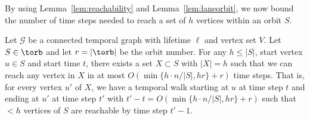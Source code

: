 By using Lemma~\ref{lem:reachability} and Lemma~\ref{lem:laneorbit}, we now
bound the number of time steps needed to reach a set of $h$ vertices within an
orbit $S$.

\begin{lemma}\label{lem:nextreachable} Let $\mathcal{G}$ be a connected temporal
graph with lifetime $\ell$ and vertex set $V$. Let $S \in \torb$ and let
$r=|\torb|$ be the orbit number. For any $h \leq |S|$, start vertex {$u \in S$}
{and start time $t$}, there exists a set $X \subset S$ {with $|X|=h$} such that
we can reach any vertex in $X$ in at most $O(\min\{h \cdot n / |S|, h r\}+r)$
time steps. That is, for every vertex $u'$ of $X$, we have a temporal walk
starting at $u$ at time step $t$ and ending at $u'$ at time step $t'$ with
$t'-t=O(\min\{h \cdot n / |S|, h r\}+r)$ {such that $<h$ vertices of $S$ are reachable
by time step $t'-1$.}
\end{lemma}

